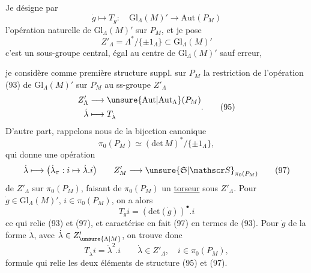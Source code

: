 Je désigne par
\[
\dot g\mapsto T_{\dot g}:\quad\mathrm{Gl}_\Lambda(M)'\longrightarrow\mathrm{Aut}(P_M)\tag*{(93)}
\]
l'opération naturelle de $\mathrm{Gl}_\Lambda(M)'$ sur $P_M$, et je  pose
\[
Z'_\Lambda=\Lambda^*/\{\pm1_\Lambda\}\subset\mathrm{Gl}_\Lambda(M)'\tag*{(94)}
\]
c'est un sous-groupe central, égal au centre de $\mathrm{Gl}_\Lambda(M)'$ sauf erreur,

je considère comme première structure suppl. sur $P_M$ la restriction de l'opération (93) de $\mathrm{Gl}_\Lambda(M)'$ sur $P_M$ au ss-groupe $Z'_\Lambda$
\[
\begin{aligned}
Z'_\Lambda&\longrightarrow\unsure{\mathrm{Aut}|\mathrm{Aut}_\Lambda}(P_M)\\
\dot\lambda&\longmapsto T_{\dot\lambda}
\end{aligned}.\tag*{(95)}
\]
D'autre part,  rappelons nous de la bijection canonique
\[
\pi_0(P_M)\simeq(\mathrm{det}\,M)^*/\{\pm1_\Lambda\},\tag*{(96)}
\]
qui donne une opération
\[
\dot\lambda\longmapsto\bigl(\dot\lambda_\pi:i\mapsto\dot\lambda.i\bigr)
\qquad Z'_M\longrightarrow\unsure{\mathfrak S|\mathscr S}_{\pi_0(P_M)}\tag*{(97)}
\]
de $Z'_\Lambda$ sur $\pi_0(P_M)$, faisant de $\pi_0(P_M)$ un \uline{torseur} sous $Z'_\Lambda$. Pour $\dot g\in\mathrm{Gl}_\Lambda(M)'$, $i\in\pi_0(P_M)$,
on a alors
\[
T_{\dot g}i=(\mathrm{det}(\dot g))^\bullet.i\tag*{(98)}
\]
ce qui relie (93) et (97), et caractérise en fait (97) en termes de (93). Pour $\dot g$ de la forme $\dot\lambda$, avec $\dot\lambda\in Z'_{\unsure{\Lambda|M}}$, on trouve donc
\[
T_{\dot\lambda}i=\dot\lambda^2.i\qquad\dot\lambda\in Z'_\Lambda,\quad i\in\pi_0(P_M),\tag*{(99)}
\]
formule qui relie les deux éléments de structure (95) et (97).

